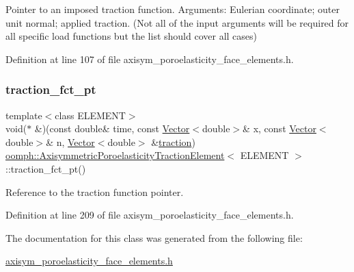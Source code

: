 Pointer to an imposed traction function. Arguments\+: Eulerian coordinate; outer unit normal; applied traction. (Not all of the input arguments will be required for all specific load functions but the list should cover all cases) 



Definition at line 107 of file axisym\+\_\+poroelasticity\+\_\+face\+\_\+elements.\+h.

\mbox{\label{classoomph_1_1AxisymmetricPoroelasticityTractionElement_aa33c50e13b91213e8f5b5babf507718e}} 
\subsubsection{\texorpdfstring{traction\+\_\+fct\+\_\+pt}{traction\_fct\_pt}}
{\footnotesize\ttfamily template$<$class E\+L\+E\+M\+E\+NT$>$ \\
void($\ast$ \&)(const double\& time, const \hyperlink{classoomph_1_1Vector}{Vector}$<$double$>$\& x, const \hyperlink{classoomph_1_1Vector}{Vector}$<$double$>$\& n, \hyperlink{classoomph_1_1Vector}{Vector}$<$double$>$ \&\hyperlink{classoomph_1_1AxisymmetricPoroelasticityTractionElement_abb8e937540df8384b6129793497f1e50}{traction}) \hyperlink{classoomph_1_1AxisymmetricPoroelasticityTractionElement}{oomph\+::\+Axisymmetric\+Poroelasticity\+Traction\+Element}$<$ E\+L\+E\+M\+E\+NT $>$\+::traction\+\_\+fct\+\_\+pt()\hspace{0.3cm}{\ttfamily [inline]}}



Reference to the traction function pointer. 



Definition at line 209 of file axisym\+\_\+poroelasticity\+\_\+face\+\_\+elements.\+h.



The documentation for this class was generated from the following file\+:\begin{DoxyCompactItemize}
\item 
\hyperlink{axisym__poroelasticity__face__elements_8h}{axisym\+\_\+poroelasticity\+\_\+face\+\_\+elements.\+h}\end{DoxyCompactItemize}
